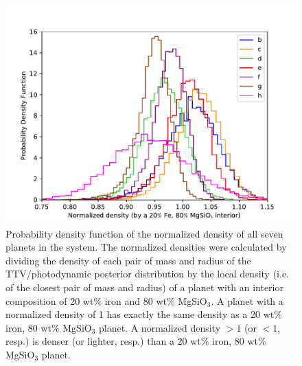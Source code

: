 \documentclass[twocolumn]{aastex63}
\begin{document}
\begin{figure}
    \centering
    \includegraphics[width=\hsize]{figures/plot_normalized_density_agol_et_al.pdf}
    \caption{Probability density function of the normalized density of all seven planets in the system.
    The normalized densities were calculated by dividing the density of each pair of mass and radius of the TTV/photodynamic posterior distribution by the local density (i.e. of the closest pair of mass and radius) of a planet with an interior composition of 20 wt\% iron and 80 wt\% MgSiO$_3$. A planet with a normalized density of 1 has exactly the same density as a 20 wt\% iron, 80 wt\% MgSiO$_3$ planet. A normalized density ${>}1$ (or ${<}1$, resp.) is denser (or lighter, resp.) than a 20 wt\% iron, 80 wt\% MgSiO$_3$ planet.}
    \label{fig:norm_density_histo}
\end{figure}
\end{document}
